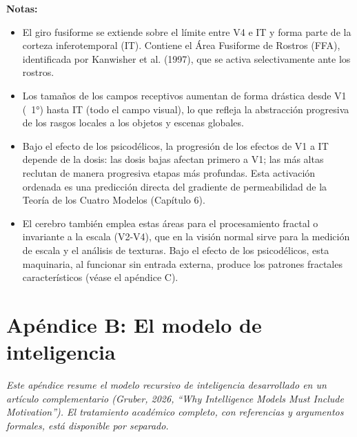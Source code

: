 \documentclass[11pt, twoside, openright]{book}
\begin{document}
\textbf{Notas:}
\begin{itemize}
  \item El giro fusiforme se extiende sobre el límite entre V4 e IT y forma parte de la corteza inferotemporal (IT). Contiene el Área Fusiforme de Rostros (FFA), identificada por Kanwisher et al. (1997), que se activa selectivamente ante los rostros.
  \item Los tamaños de los campos receptivos aumentan de forma drástica desde V1 (~1°) hasta IT (todo el campo visual), lo que refleja la abstracción progresiva de los rasgos locales a los objetos y escenas globales.
  \item Bajo el efecto de los psicodélicos, la progresión de los efectos de V1 a IT depende de la dosis: las dosis bajas afectan primero a V1; las más altas reclutan de manera progresiva etapas más profundas. Esta activación ordenada es una predicción directa del gradiente de permeabilidad de la Teoría de los Cuatro Modelos (Capítulo 6).
  \item El cerebro también emplea estas áreas para el procesamiento fractal o invariante a la escala (V2-V4), que en la visión normal sirve para la medición de escala y el análisis de texturas. Bajo el efecto de los psicodélicos, esta maquinaria, al funcionar sin entrada externa, produce los patrones fractales característicos (véase el apéndice C).
\end{itemize}


\chapter*{Apéndice B: El modelo de inteligencia}

\textit{Este apéndice resume el modelo recursivo de inteligencia desarrollado en un artículo complementario (Gruber, 2026, ``Why Intelligence Models Must Include Motivation''). El tratamiento académico completo, con referencias y argumentos formales, está disponible por separado.}
\end{document}
